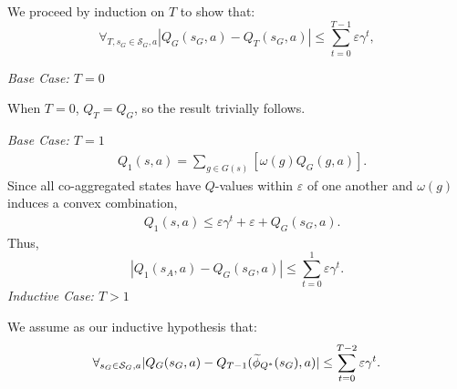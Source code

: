 We proceed by induction on $T$ to show that:
\begin{equation}
\label{eq:clm1Induct}
\forall_{T, s_G \in \mathcal{S}_G, a} |Q_G(s_G, a) - Q_T(s_G, a)| \leq \sum_{t=0}^{T-1} \varepsilon \gamma^{t},
\end{equation}

\textit{Base Case: $T = 0$}

When $T = 0$, $Q_T = Q_G$, so the result trivially follows.

\textit{Base Case: $T = 1$}
\begin{align*}
&Q_1(s,a) = \underset{g \in G(s)}{\sum} \left[ \omega(g)Q_G(g,a) \right].
\end{align*}
Since all co-aggregated states have $Q$-values within $\varepsilon$ of one another and $\omega(g)$ induces a convex combination,
\begin{align*}
&Q_1(s,a) \leq \varepsilon \gamma^t + \varepsilon + Q_G(s_G, a).
\end{align*}
Thus,
\begin{equation}
\left| Q_{1}(s_A, a) - Q_G(s_G,a) \right| \leq \sum_{t=0}^{1}\varepsilon \gamma^t.
\end{equation}
\textit{Inductive Case: $T > 1$}

We assume as our inductive hypothesis that:
\begin{equation*}
\forall_{s_G \in \mathcal{S}_G, a} |Q_G(s_G, a) - Q_{T-1}(\widetilde \phi_{Q^*}(s_G), a)| \leq \sum_{t=0}^{T-2} \varepsilon \gamma^t.
\end{equation*}


